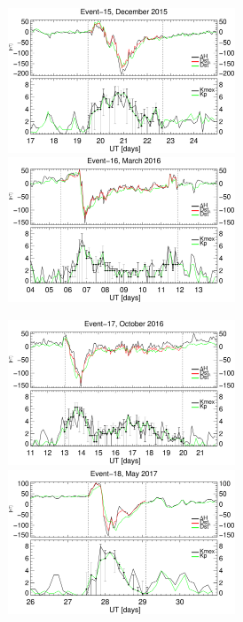 \documentclass[a4paper,fleqn]{cas-dc}
\begin{document}
\begin{figure}[h!]
     \centerline{\Large \bf   
      \hspace{0.275\textwidth}  \color{black}{}
       \hspace{0.295\textwidth}  \color{black}{}
         \hfill}
      \includegraphics[width=6.0cm]{images/dH_approx/diono_valid_V4_2015-12-17.eps}     
      \includegraphics[width=6.0cm]{images/dH_approx/diono_valid_V4_2016-03-04.eps}
       \centerline{\Large \bf   
      \hspace{0.275\textwidth}  \color{black}{}
       \hspace{0.295\textwidth}  \color{black}{}
         \hfill}
       \includegraphics[width=6.0cm]{images/dH_approx/diono_valid_V4_2016-10-11.eps}     
       \includegraphics[width=6.0cm]{images/dH_approx/diono_valid_V4_2017-05-26.eps}


\end{figure}
\end{document}
